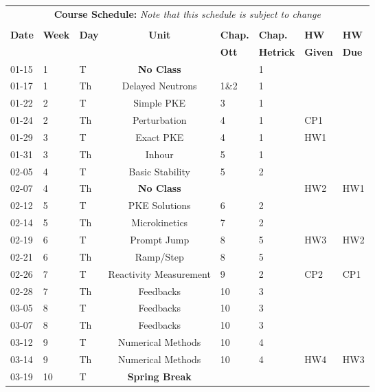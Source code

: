 \documentclass[11pt]{article}
\begin{document}
\pagebreak
\FloatBarrier
\renewcommand{\arraystretch}{1}
\begin{table}[h]
\begin{center}
\begin{tabular}{lllcllll}
\multicolumn{8}{c}{\textbf{Course Schedule:}\textit{ Note that this schedule is subject to change}}\\
&&&&&&&\\
\textbf{Date} & \textbf{Week} & \textbf{Day} & \textbf{Unit} & \textbf{Chap.} & \textbf{Chap.} & \textbf{HW} & \textbf{HW}\\
              &  &  & & \textbf{Ott}& \textbf{Hetrick} & \textbf{Given} & \textbf{Due}\\
\hline
\hline
01-15 & 1 & T  & \textbf{No Class}               &    & 1 &      & \\
01-17 & 1 & Th & Delayed Neutrons       & 1\&2  & 1 &      & \\
01-22 & 2 & T  & Simple PKE             & 3  & 1 &      & \\
01-24 & 2 & Th & Perturbation           & 4  & 1 & CP1  & \\
01-29 & 3 & T  & Exact PKE              & 4  & 1 & HW1  & \\
01-31 & 3 & Th & Inhour                 & 5  & 1 &      & \\
02-05 & 4 & T  & Basic Stability        & 5  & 2 &      & \\
02-07 & 4 & Th & \textbf{No Class}               &    &  & HW2  & HW1\\
02-12 & 5 & T  & PKE Solutions          & 6  & 2 &      & \\
02-14 & 5 & Th & Microkinetics          & 7  & 2 &      & \\
02-19 & 6 & T  & Prompt Jump            & 8  & 5 & HW3  & HW2\\
02-21 & 6 & Th & Ramp/Step              & 8  & 5 &      & \\
02-26 & 7 & T  & Reactivity Measurement & 9  & 2 & CP2  & CP1\\
02-28 & 7 & Th & Feedbacks              & 10 & 3 &      & \\
03-05 & 8 & T  & Feedbacks              & 10 & 3 &      & \\
03-07 & 8 & Th & Feedbacks              & 10 & 3 &      & \\
03-12 & 9 & T  & Numerical Methods      & 10 & 4 &      & \\
03-14 & 9 & Th & Numerical Methods      & 10 & 4 & HW4  & HW3\\
03-19 & 10 & T  & \textbf{Spring Break} &    &   &      & \\

\end{tabular}
\end{center}
\end{table}
\end{document}
